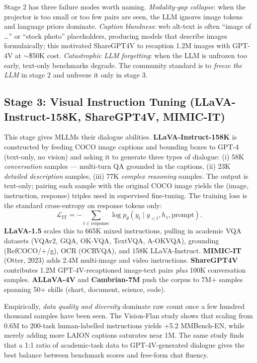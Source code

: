 \documentclass{article}
\begin{document}
Stage 2 has three failure modes worth naming. \emph{Modality-gap collapse}: when the projector is too small or too few pairs are seen, the LLM ignores image tokens and language priors dominate. \emph{Caption blandness}: web alt-text is often ``image of \ldots{}'' or ``stock photo'' placeholders, producing models that describe images formulaically; this motivated ShareGPT4V \citep{chen20242024} to recaption 1.2M images with GPT-4V at \(\sim\)\$50K cost. \emph{Catastrophic LLM forgetting}: when the LLM is unfrozen too early, text-only benchmarks degrade. The community standard is to \emph{freeze the LLM} in stage 2 and unfreeze it only in stage 3.

\subsection{Stage 3: Visual Instruction Tuning (LLaVA-Instruct-158K, ShareGPT4V, MIMIC-IT)}\label{stage-3-visual-instruction-tuning-llava-instruct-158k-sharegpt4v-mimic-it}

This stage gives MLLMs their dialogue abilities. \textbf{LLaVA-Instruct-158K} is constructed by feeding COCO image captions and bounding boxes to GPT-4 (text-only, no vision) and asking it to generate three types of dialogue: (i) 58K \emph{conversation} samples --- multi-turn QA grounded in the captions, (ii) 23K \emph{detailed description} samples, (iii) 77K \emph{complex reasoning} samples. The output is text-only; pairing each sample with the original COCO image yields the (image, instruction, response) triples used in supervised fine-tuning. The training loss is the standard cross-entropy on response tokens only:
\[\mathcal{L}_{\text{IT}} = -\sum_{t \in \text{response}} \log p_\theta(y_t \mid y_{<t}, h_v, \text{prompt}).\]
\textbf{LLaVA-1.5} scales this to 665K mixed instructions, pulling in academic VQA datasets (VQAv2, GQA, OK-VQA, TextVQA, A-OKVQA), grounding (RefCOCO/+/g), OCR (OCRVQA), and 158K LLaVA-Instruct. \textbf{MIMIC-IT} (Otter, 2023) adds 2.4M multi-image and video instructions. \textbf{ShareGPT4V} contributes 1.2M GPT-4V-recaptioned image-text pairs \emph{plus} 100K conversation samples. \textbf{ALLaVA-4V} and \textbf{Cambrian-7M} push the corpus to 7M+ samples spanning 50+ skills (chart, document, science, code).

Empirically, \emph{data quality and diversity} dominate raw count once a few hundred thousand samples have been seen. The Vision-Flan study \citep{xu2023multimodallearning} shows that scaling from 0.6M to 200-task human-labelled instructions yields +5.2 MMBench-EN, while merely adding more LAION captions saturates near 1M. The same study finds that a 1:1 ratio of academic-task data to GPT-4V-generated dialogue gives the best balance between benchmark scores and free-form chat fluency.
\end{document}
